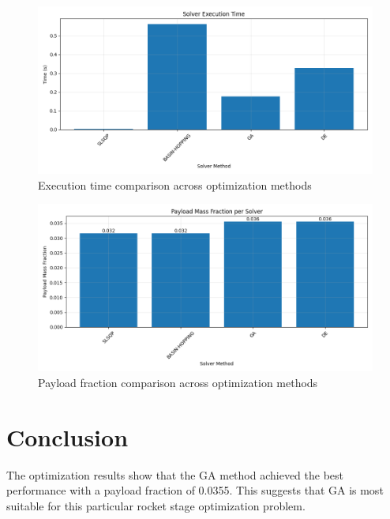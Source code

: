 \documentclass{article}
\begin{document}
\begin{figure}[H]
\centering
\includegraphics[width=\textwidth]{execution_time.png}
\caption{Execution time comparison across optimization methods}
\label{fig:execution-time}
\end{figure}

\begin{figure}[H]
\centering
\includegraphics[width=\textwidth]{payload_fraction.png}
\caption{Payload fraction comparison across optimization methods}
\label{fig:payload-fraction}
\end{figure}

\section{Conclusion}
The optimization results show that the GA method achieved the best performance with a payload fraction of 0.0355. This suggests that GA is most suitable for this particular rocket stage optimization problem.
\end{document}
